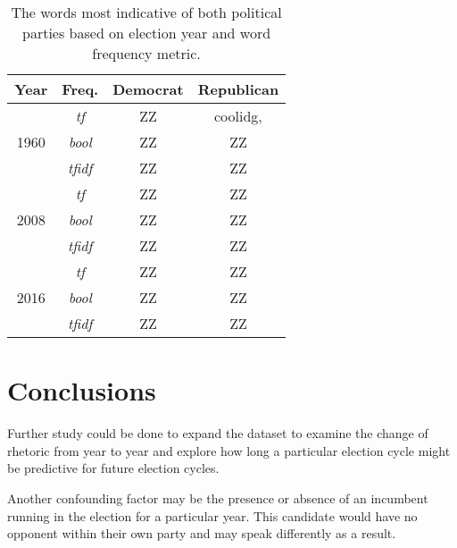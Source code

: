 \documentclass[aps, prl, reprint, showpacs]{revtex4-1}
\begin{document}
\begin{table} %
  \begin{ruledtabular}
  \begin{tabular}{cccc}
  Year & Freq. & Democrat & Republican \\
    \hline
 & \textit{tf} & ZZ  & coolidg,   \\
1960 & \textit{bool} & ZZ  & ZZ  \\
 & \textit{tfidf} & ZZ  & ZZ  \\
 \hline
 & \textit{tf} & ZZ  & ZZ  \\
2008 & \textit{bool} & ZZ  & ZZ  \\
 & \textit{tfidf} & ZZ  & ZZ  \\
 \hline
 & \textit{tf} & ZZ  & ZZ  \\
2016 & \textit{bool} & ZZ  & ZZ  \\
 & \textit{tfidf} & ZZ  & ZZ  \\
 \hline
  \end{tabular}
  \end{ruledtabular}
    \caption{The words most indicative of both political parties based on election year and word frequency metric.}
    \label{tab:words}
\end{table}


\section{Conclusions}

Further study could be done to expand the dataset to examine the change of rhetoric from year to year and explore how long a particular election cycle might be predictive for future election cycles.

Another confounding factor may be the presence or absence of an incumbent running in the election for a particular year. This candidate would have no opponent within their own party and may speak differently as a result.

\end{document}
